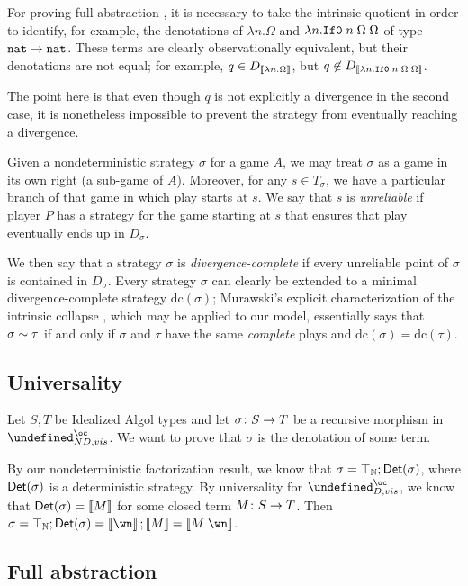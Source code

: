 \documentclass[sigplan,9pt,review]{acmart}\settopmatter{printfolios=true,printccs=false,printacmref=false}
\let\G\undefined
\begin{document}
For proving full abstraction , it is necessary to take the intrinsic quotient in order to identify, for example, the denotations of $\lambda n.\Omega$ and $\lambda n.{\mathtt{If0}\;} n\;\Omega\;\Omega$ of type ${\mathtt{nat}}\to{\mathtt{nat}}$.  
These terms are clearly observationally equivalent, but their denotations are not equal; for example, $q\in D_{\left\llbracket\lambda n.\Omega\right\rrbracket}$, but $q\not\in D_{\left\llbracket\lambda n.{\mathtt{If0}\;} n\;\Omega\;\Omega\right\rrbracket}$.

The point here is that even though $q$ is not explicitly a divergence in the second case, it is nonetheless impossible to prevent the strategy from eventually reaching a divergence.  

Given a nondeterministic strategy $\sigma$ for a game $A$, we may treat $\sigma$ as a game in its own right (a sub-game of $A$).  
Moreover, for any $s\in T_\sigma$, we have a particular branch of that game in which play starts at $s$.  
We say that $s$ is \emph{unreliable} if player $P$ has a strategy for the game starting at $s$ that ensures that play eventually ends up in $D_\sigma$.  

We then say that a strategy $\sigma$ is \emph{divergence-complete} if every unreliable point of $\sigma$ is contained in $D_\sigma$.  
Every strategy $\sigma$ can clearly be extended to a minimal divergence-complete strategy $\text{dc}(\sigma)$; Murawski's explicit characterization of the intrinsic collapse \cite{MurawskiIntrinsic}, which may be applied to our model, essentially says that $\sigma\sim\tau$ if and only if $\sigma$ and $\tau$ have the same \emph{complete} plays and $\text{dc}(\sigma)=\text{dc}(\tau)$.

\subsection{Universality}

Let $S,T$ be Idealized Algol types and let $\sigma\colon S\to T$ be a recursive morphism in $\G_{ND,vis}^\oc$.  
We want to prove that $\sigma$ is the denotation of some term.  

By our nondeterministic factorization result, we know that $\sigma=\top_{\mathbb{N}};\mathsf{Det}(\sigma)$, where $\mathsf{Det}(\sigma)$ is a deterministic strategy.  
By universality for $\G_{D,vis}^\oc$, we know that $\mathsf{Det}(\sigma)=\left\llbracket M\right\rrbracket$ for some closed term $M\colon S \to T$.  
Then $\sigma=\top_\bN;\Det(\sigma)=\deno{\wn};\deno M = \deno{M\;\wn}$.

\subsection{Full abstraction}
\end{document}
